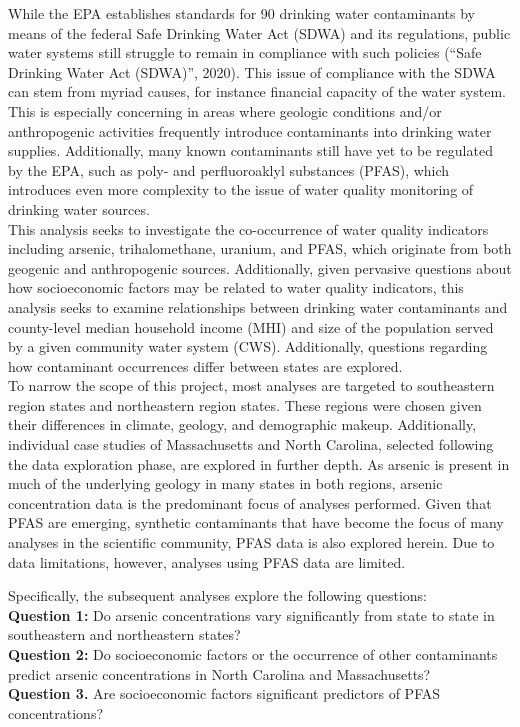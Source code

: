 \documentclass[12pt,]{article}
\begin{document}
While the EPA establishes standards for 90 drinking water contaminants
by means of the federal Safe Drinking Water Act (SDWA) and its
regulations, public water systems still struggle to remain in compliance
with such policies (``Safe Drinking Water Act (SDWA)'', 2020). This
issue of compliance with the SDWA can stem from myriad causes, for
instance financial capacity of the water system. This is especially
concerning in areas where geologic conditions and/or anthropogenic
activities frequently introduce contaminants into drinking water
supplies. Additionally, many known contaminants still have yet to be
regulated by the EPA, such as poly- and perfluoroaklyl substances
(PFAS), which introduces even more complexity to the issue of water
quality monitoring of drinking water sources.\\
This analysis seeks to investigate the co-occurrence of water quality
indicators including arsenic, trihalomethane, uranium, and PFAS, which
originate from both geogenic and anthropogenic sources. Additionally,
given pervasive questions about how socioeconomic factors may be related
to water quality indicators, this analysis seeks to examine
relationships between drinking water contaminants and county-level
median household income (MHI) and size of the population served by a
given community water system (CWS). Additionally, questions regarding
how contaminant occurrences differ between states are explored.\\
To narrow the scope of this project, most analyses are targeted to
southeastern region states and northeastern region states. These regions
were chosen given their differences in climate, geology, and demographic
makeup. Additionally, individual case studies of Massachusetts and North
Carolina, selected following the data exploration phase, are explored in
further depth. As arsenic is present in much of the underlying geology
in many states in both regions, arsenic concentration data is the
predominant focus of analyses performed. Given that PFAS are emerging,
synthetic contaminants that have become the focus of many analyses in
the scientific community, PFAS data is also explored herein. Due to data
limitations, however, analyses using PFAS data are limited.

Specifically, the subsequent analyses explore the following questions:\\
\textbf{Question 1:} Do arsenic concentrations vary significantly from
state to state in southeastern and northeastern states?\\
\textbf{Question 2:} Do socioeconomic factors or the occurrence of other
contaminants predict arsenic concentrations in North Carolina and
Massachusetts?\\
\textbf{Question 3.} Are socioeconomic factors significant predictors of
PFAS concentrations?
\end{document}
